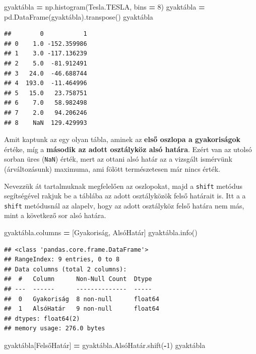 \documentclass[
]{book}
\newenvironment{Shaded}{\begin{snugshade}}{\end{snugshade}}
\newcommand{\DecValTok}[1]{\textcolor[rgb]{0.00,0.00,0.81}{#1}}
\newcommand{\NormalTok}[1]{#1}
\newcommand{\OperatorTok}[1]{\textcolor[rgb]{0.81,0.36,0.00}{\textbf{#1}}}
\newcommand{\StringTok}[1]{\textcolor[rgb]{0.31,0.60,0.02}{#1}}
\begin{document}
\begin{Shaded}
\begin{Highlighting}[]
\NormalTok{gyaktábla }\OperatorTok{=}\NormalTok{ np.histogram(Tesla.TESLA, bins }\OperatorTok{=} \DecValTok{8}\NormalTok{)}
\NormalTok{gyaktábla }\OperatorTok{=}\NormalTok{ pd.DataFrame(gyaktábla).transpose()}
\NormalTok{gyaktábla}
\end{Highlighting}
\end{Shaded}

\begin{verbatim}
##        0           1
## 0    1.0 -152.359986
## 1    3.0 -117.136239
## 2    5.0  -81.912491
## 3   24.0  -46.688744
## 4  193.0  -11.464996
## 5   15.0   23.758751
## 6    7.0   58.982498
## 7    2.0   94.206246
## 8    NaN  129.429993
\end{verbatim}

Amit kaptunk az egy olyan tábla, aminek az \textbf{első oszlopa a gyakoriságok} értéke, míg a \textbf{második az adott osztályköz alsó határa}. Ezért van az utolsó sorban üres (\texttt{NaN}) érték, mert az ottani alsó határ az a vizsgált ismérvünk (árváltozásunk) maximuma, ami fölött természetesen már nincs érték.

Nevezzük át tartalmuknak megfelelően az oszlopokat, majd a \texttt{shift} metódus segítségével rakjuk be a táblába az adott osztályközök felső határait is. Itt a a \texttt{shift} metódusnál az alapelv, hogy az adott osztályköz felső határa nem más, mint a következő sor alsó határa.

\begin{Shaded}
\begin{Highlighting}[]
\NormalTok{gyaktábla.columns }\OperatorTok{=}\NormalTok{ [}\StringTok{\textquotesingle{}Gyakoriság\textquotesingle{}}\NormalTok{, }\StringTok{\textquotesingle{}AlsóHatár\textquotesingle{}}\NormalTok{]}
\NormalTok{gyaktábla.info()}
\end{Highlighting}
\end{Shaded}

\begin{verbatim}
## <class 'pandas.core.frame.DataFrame'>
## RangeIndex: 9 entries, 0 to 8
## Data columns (total 2 columns):
##  #   Column      Non-Null Count  Dtype  
## ---  ------      --------------  -----  
##  0   Gyakoriság  8 non-null      float64
##  1   AlsóHatár   9 non-null      float64
## dtypes: float64(2)
## memory usage: 276.0 bytes
\end{verbatim}

\begin{Shaded}
\begin{Highlighting}[]
\NormalTok{gyaktábla[}\StringTok{\textquotesingle{}FelsőHatár\textquotesingle{}}\NormalTok{] }\OperatorTok{=}\NormalTok{ gyaktábla.AlsóHatár.shift(}\OperatorTok{{-}}\DecValTok{1}\NormalTok{)}
\NormalTok{gyaktábla}
\end{Highlighting}
\end{Shaded}
\end{document}
